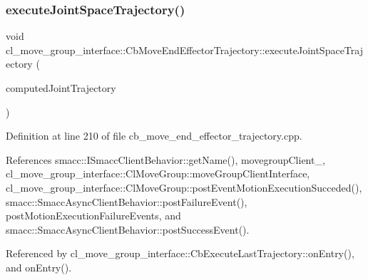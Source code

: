 \mbox{\label{classcl__move__group__interface_1_1CbMoveEndEffectorTrajectory_a3a75fa185c62591e1869427650338a32}} 
\subsubsection{\texorpdfstring{execute\+Joint\+Space\+Trajectory()}{executeJointSpaceTrajectory()}}
{\footnotesize\ttfamily void cl\+\_\+move\+\_\+group\+\_\+interface\+::\+Cb\+Move\+End\+Effector\+Trajectory\+::execute\+Joint\+Space\+Trajectory (\begin{DoxyParamCaption}\item[{const moveit\+\_\+msgs\+::\+Robot\+Trajectory \&}]{computed\+Joint\+Trajectory }\end{DoxyParamCaption})\hspace{0.3cm}{\ttfamily [protected]}}



Definition at line 210 of file cb\+\_\+move\+\_\+end\+\_\+effector\+\_\+trajectory.\+cpp.



References smacc\+::\+I\+Smacc\+Client\+Behavior\+::get\+Name(), movegroup\+Client\+\_\+, cl\+\_\+move\+\_\+group\+\_\+interface\+::\+Cl\+Move\+Group\+::move\+Group\+Client\+Interface, cl\+\_\+move\+\_\+group\+\_\+interface\+::\+Cl\+Move\+Group\+::post\+Event\+Motion\+Execution\+Succeded(), smacc\+::\+Smacc\+Async\+Client\+Behavior\+::post\+Failure\+Event(), post\+Motion\+Execution\+Failure\+Events, and smacc\+::\+Smacc\+Async\+Client\+Behavior\+::post\+Success\+Event().



Referenced by cl\+\_\+move\+\_\+group\+\_\+interface\+::\+Cb\+Execute\+Last\+Trajectory\+::on\+Entry(), and on\+Entry().


